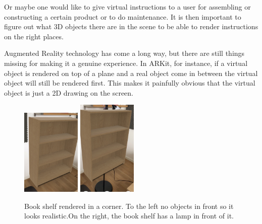 Or maybe one would like to give virtual instructions to a user for assembling or constructing a certain product or to do maintenance. It is then important to figure out what 3D objects there are in the scene to be able to render instructions on the right places.

Augmented Reality technology has come a long way, but there are still things missing for making it a genuine experience. In ARKit, for instance, if a virtual object is rendered on top of a plane and a real object come in between the virtual object will still be rendered first. This makes it painfully obvious that the virtual object is just a 2D drawing on the screen.

\begin{figure}[hbtp]
\begin{center}
\includegraphics[width = 0.25\textwidth]{./Images/overlapping2.jpg} 
\includegraphics[width = 0.25\textwidth]{./Images/overlapping1.jpg} 
\caption{Book shelf rendered in a corner. To the left no objects in front so it looks realistic.On the right, the book shelf has a lamp in front of it.}
\end{center}
\end{figure}

\newpage